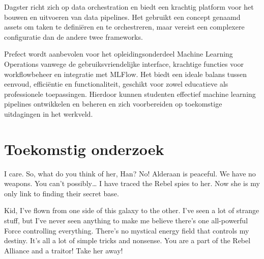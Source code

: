 \documentclass[a0,portrait]{hogent-poster}
\begin{document}
\begin{multicols}{2}
Dagster richt zich op data orchestration en biedt een krachtig platform voor het bouwen en uitvoeren van data pipelines. Het gebruikt een concept genaamd assets om taken te definiëren en te orchestreren, maar vereist een complexere configuratie dan de andere twee frameworks.

Prefect wordt aanbevolen voor het opleidingsonderdeel Machine Learning Operations vanwege de gebruiksvriendelijke interface, krachtige functies voor workflowbeheer en integratie met MLFlow. Het biedt een ideale balans tussen eenvoud, efficiëntie en functionaliteit, geschikt voor zowel educatieve als professionele toepassingen. Hierdoor kunnen studenten effectief machine learning pipelines ontwikkelen en beheren en zich voorbereiden op toekomstige uitdagingen in het werkveld.
\section{Toekomstig onderzoek}

I care. So, what do you think of her, Han? No! Alderaan is peaceful. We have no weapons. You can't possibly… I have traced the Rebel spies to her. Now she is my only link to finding their secret base.

Kid, I've flown from one side of this galaxy to the other. I've seen a lot of strange stuff, but I've never seen anything to make me believe there's one all-powerful Force controlling everything. There's no mystical energy field that controls my destiny. It's all a lot of simple tricks and nonsense. You are a part of the Rebel Alliance and a traitor! Take her away! 

\end{multicols}
\end{document}
